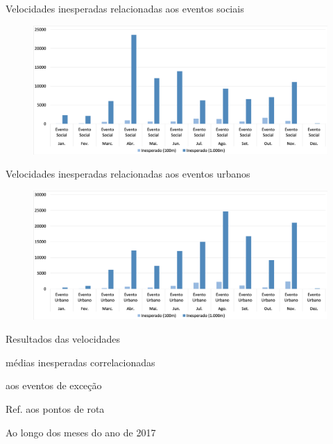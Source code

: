 \documentclass{beamer}
\begin{document}
\begin{frame}{Velocidades inesperadas relacionadas aos eventos sociais}
\begin{figure}[!htb]
	\centering
		\includegraphics[width=1\linewidth]{apriori_analysis_stops_social_events_.png}
	\label{fig:apriori_analysis_stops_social_events}
\end{figure}
\end{frame}
\begin{frame}{Velocidades inesperadas relacionadas aos eventos urbanos}
\begin{figure}[!htb]
	\centering
		\includegraphics[width=1\linewidth]{apriori_analysis_stops_urban_events_.png}
	\label{fig:apriori_analysis_stops_urban_events}
\end{figure}
\end{frame}
\begin{frame}
\Huge{\centerline{Resultados das velocidades}}
\Huge{\centerline{médias inesperadas correlacionadas}}
\Huge{\centerline{aos eventos de exceção}}
\Huge{\centerline{Ref. aos \alert{pontos de rota}}}
\Huge{\centerline{Ao longo dos meses do ano de 2017}}
\end{frame}
\end{document}
